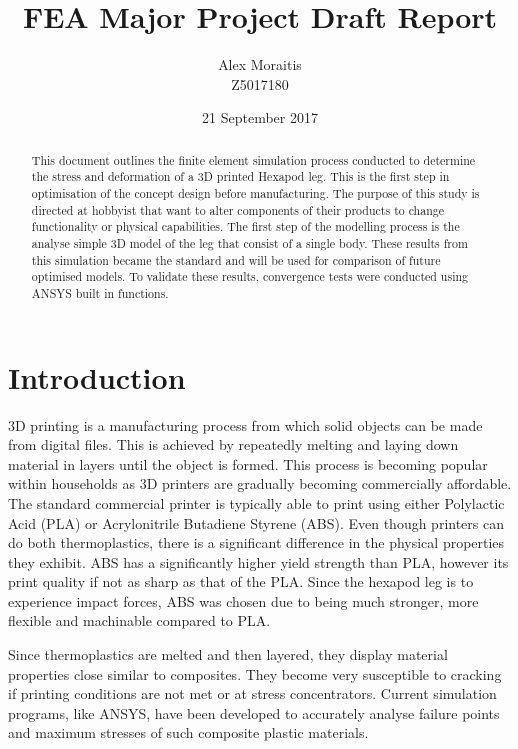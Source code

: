 \documentclass[a4paper]{article}
\title{FEA Major Project Draft Report}
\author{Alex Moraitis\\Z5017180}
\date{21 September 2017}
\begin{document}
\maketitle

\begin{abstract}
This document outlines the finite element simulation process conducted to determine the stress and deformation of a 3D printed Hexapod leg. This is the first step in optimisation of the concept design before manufacturing. The purpose of this study is directed at hobbyist that want to alter components of their products to change functionality or physical capabilities. The first step of the modelling process is the analyse simple 3D model of the leg that consist of a single body. These results from this simulation became the standard and will be used for comparison of future optimised models. To validate these results, convergence tests were conducted using ANSYS built in functions.
\end{abstract}

\newpage
\tableofcontents
\newpage

\section{Introduction}
3D printing is a manufacturing process from which solid objects can be made from digital files. This is achieved by repeatedly melting and laying down material in layers until the object is formed. This process is becoming popular within households as 3D printers are gradually becoming commercially affordable. The standard commercial printer is typically able to print using either Polylactic Acid (PLA) or Acrylonitrile Butadiene Styrene (ABS). Even though printers can do both thermoplastics, there is a significant difference in the physical properties they exhibit. ABS has a  significantly higher yield strength than PLA, however its print quality if not as sharp as that of the PLA. Since the hexapod leg is to experience impact forces, ABS was chosen due to  being much stronger, more flexible and machinable compared to PLA.

Since thermoplastics are melted and then layered, they display material properties close similar to composites. They become very susceptible to cracking if printing conditions are not met or at stress concentrators. Current simulation programs, like ANSYS, have been developed to accurately analyse failure points and maximum stresses of such composite plastic materials.
\newpage
\end{document}

